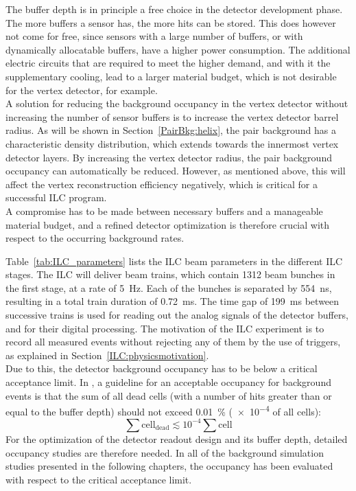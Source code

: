 The buffer depth is in principle a free choice in the detector development phase.
The more buffers a sensor has, the more hits can be stored.
This does however not come for free, since sensors with a large number of buffers, or with dynamically allocatable buffers, have a higher power consumption.
The additional electric circuits that are required to meet the higher demand, and with it the supplementary cooling, lead to a larger material budget, which is not desirable for the vertex detector, for example.
\\A solution for reducing the background occupancy in the \sid vertex detector without increasing the number of sensor buffers is to increase the vertex detector barrel radius.
As will be shown in Section~\ref{PairBkg:helix}, the pair background has a characteristic density distribution, which extends towards the innermost vertex detector layers.
By increasing the vertex detector radius, the pair background occupancy can automatically be reduced.
However, as mentioned above, this will affect the vertex reconstruction efficiency negatively, which is critical for a successful ILC program.
\\A compromise has to be made between necessary buffers and a manageable material budget, and a refined detector optimization is therefore crucial with respect to the occurring background rates.

Table~\ref{tab:ILC_parameters} lists the ILC beam parameters in the different ILC stages.
The ILC will deliver beam trains, which contain 1312 beam bunches in the first stage, at a rate of \SI{5}{\hertz}.
Each of the bunches is separated by \SI{554}{\nano\second}, resulting in a total train duration of \SI{0.72}{\milli\second}.
The time gap of \SI{199}{\milli\second} between successive trains is used for reading out the analog signals of the detector buffers, and for their digital processing.
The motivation of the ILC experiment is to record all measured events without rejecting any of them by the use of triggers, as explained in Section~\ref{ILC:physicsmotivation}.
\\Due to this, the detector background occupancy has to be below a critical acceptance limit.
In \sid, a guideline for an acceptable occupancy for background events is that the sum of all dead cells (with a number of hits greater than or equal to the buffer depth) should not exceed \SI{0.01}{\percent} (\num{e-4} of all cells):
\begin{equation}
 \sum \mathrm{cell}_{\mathrm{dead}} \lesssim 10^{-4} \sum \mathrm{cell}
\end{equation}
For the optimization of the detector readout design and its buffer depth, detailed occupancy studies are therefore needed.
In all of the background simulation studies presented in the following chapters, the \sid occupancy has been evaluated with respect to the critical acceptance limit.

